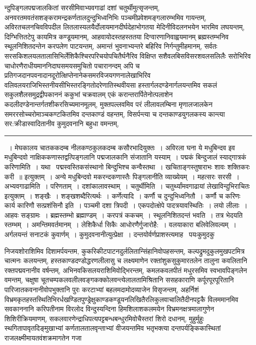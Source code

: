 \documentclass[11pt, openany]{book}
\begin{document}
\noindent
न्दुपिङ्गलपद्मजालकितां सरसीमिवाभ्यवगाढां दशां चतुर्थीमुत्सृजन्तम्, अनवरतमवतंसशङ्करामन्द्रकर्णतालदुन्दुभिध्वनिभिः पञ्चमीप्रवेशमङ्गलारम्भमिव गायन्तम्, अविरतचलनचिवविपदील लितलास्यलयैर्दोलायमानदीर्घदेहाभोगतया मेदिनीविदलनभयेन भारमिव लघयन्तम्, दिग्भित्तितटेपु कायमित्र कण्डूयमानम्, आहवायोदस्तहस्ततया दिग्वारणानिवाह्वयमानम् ब्रह्मस्तम्भनिव स्थूलनिशितदन्तेन करपलेण पाटयन्तम्, अमान्तं भुवनाभ्यन्तरे बहिरिव निर्गन्तुमीहमानम्, सर्वतः सरसकिशलयलतालासिभिर्लेशिकैश्चिरपरिचयोपचितैर्घनैरिव विक्षिप्त सशैवलबिसविसरशवलसलिलैः सरोभिरिव चाधोरणैराधीयमाननिदाघसमयसमुचितो पचारानन्दम् अपि च प्रतिगजदानपवनादानदूरोत्क्षिप्तेनानेकसमरविजयगणनालेखाभिरिव वलिवलयराजिभिस्तनीयसीभिस्तरङ्गितोदरेणातिस्थवीयसा हस्तार्गलदण्डेनार्गलयन्तमिव सकलं सकुलशैलसमुद्रद्वीपकाननं ककुभां चक्रवालम् एकं करान्तरार्पितेनोत्पलाशेन कदलीदण्डेनान्तर्गतशीकरसिच्यमानमूलम्, मुक्तपल्लवमिव परं लीलावलम्बिना मृणालजालकेन समररसोच्चरोमाञ्चकण्टकितमिव दन्तकाण्डं वहन्तम्, विसर्पन्त्या च दन्तकाण्डयुगलकस्य कान्त्या सर:क्रीडास्वादितानीव कुमुदवनानि बहुधा वमन्तम्,

\vspace{2mm}
\hrule

\noindent
{~। मेघकालय चातककदम्ब नीलकण्ठकुलकदम्ब कसौरभादियुक्तः~। अविरला घना ये मधुबिन्दव इव मधुबिन्दवो नाक्षिककणास्तद्वत्पिङ्गलानि पद्मजालकानि संजातानि यस्याम्~। पद्मकं बिन्दुजालं स्याद्गात्रकं करिणामिति~। यथा \textendash\ {\qt पद्मस्वस्तिकसंस्थानो बिन्दुभिश्च कन्वैस्तथा~। खचिताङ्गस्तुषाराभः शावः शक्तिकरः करी~॥} इत्युक्तम्~। अन्ये मधुबिन्दवो मकरन्दकणास्तैः पिङ्गलानीति व्याख्येयम्~। महत्सरः सरसी~। {\qtt अभ्यवगाढामिति}~। परिणताम्~। दशांकालावस्थाम्~। {\qtt चतुर्थीमिति}~। {\qt चतुर्थ्यांमवगाढायां लेखाविन्दुभिराचितः} इत्युक्तम्~। शङ्खैः~। शङ्खशब्दैरित्यर्थः~। {\qtt कर्णेत्यादि}~। कर्णौ च दुन्दुभिध्वनितौ~। {\qt कर्णौ च करिणः कार्य कारिणौ सत्प्रशंसिनौ} इति~। पञ्चमी दशा त्रिपदी~। एकपदोत्क्षेपे पादत्रयावस्थितिः~। लयो लीलाः~। आहवः सङ्ग्रामः~। ब्रह्मस्तम्भो ब्रह्माण्डम्~। करपत्रं ककचम्~। स्थूलनिशितदन्तं भवति~। तत्र भेदयति स्तम्भम्~। अमन्तिमवर्तमानम्~। लेशिकैर्धा सिकैः आधोरणैर्गुजारोहै:~। वलयाकारा बलिवेलिवल्यम्~। अर्गलयन्तं सनाटकं कुवार्णम्~। कुमुदवनानीत्युत्प्रेक्षा~। दन्तयोर्वर्णप्राशस्त्यमाह \textendash\ पयःकुमुदकु\textendash}

\newpage

\begin{sloppypar}
\noindent
निजयशोराशिमिव दिशामर्पयन्तम, कुकरिकीटपाटनदुर्ललितान्सिंहानिवोपहसन्तम्, कल्पद्रुमदुकुलमुखपटमित्र चात्मनः कलयन्तम्, हस्तकाण्डदण्डोद्धरणलीलासु च लक्ष्यमाणेन रक्तांशुकसुकुमारतलेन तालुना कवलितानि रक्तपद्मवनानीव वर्षन्तम्, अभिनवकिसलयराशिमिवोद्भिरन्तम्, कमलकवलपीतं मधुरसमिव स्वभावपिङ्गलेन वमन्तम्, चक्षुषा चूतचम्पकलवलीलवङ्गकक्कोलवन्त्येलालतामिश्रितानि ससहकाराणि कर्पूरपूरपूरितानि पारिजातकवनानीवोपभुक्तानि पुरः करटाभ्यां बहलमदामोदव्याजेन विसृजन्तम्, अहर्निशं विभ्रमकृतहस्तस्थितिभिरर्धखण्डितपुण्ड्रेक्षुकाण्डकण्डूयनलिखितैरलिकुलवाचालितैदीनपट्टकै विलममानमिव सवकाननानि करिपतीनाम विरलोद विन्दुस्यन्दिना हिमशिलाशकलमयेन विभ्रमनक्षत्रमालागुणेन शिशिरीक्रियमाणम्, सकलवारणेन्द्राधिपत्यपट्टबन्धबन्धुरमिवोचैस्तरां शिरो दधानम्, मुहुर्मुहुः स्थगितापावृतदिङ्मुखाभ्यां कर्णतालतालवृन्ताभ्यां वीजयन्तमिव भतृभक्त्या दन्तपर्यङ्किकास्थितां राजलक्ष्मीमायतवंशक्रमागतेन गजा\textendash
\end{sloppypar}
\end{document}
